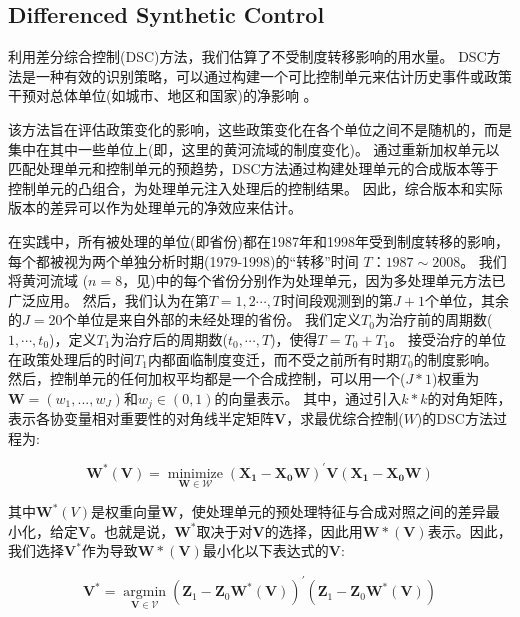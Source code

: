 \subsection{Differenced Synthetic Control}\label{sec:DSC}

利用差分综合控制(DSC)方法，我们估算了不受制度转移影响的用水量。
DSC方法是一种有效的识别策略，可以通过构建一个可比控制单元来估计历史事件或政策干预对总体单位(如城市、地区和国家)的净影响 \cite{abadie2010, abadie2015, hill2021}。

该方法旨在评估政策变化的影响，这些政策变化在各个单位之间不是随机的，而是集中在其中一些单位上(即，这里的黄河流域的制度变化)。
通过重新加权单元以匹配处理单元和控制单元的预趋势，DSC方法通过构建处理单元的合成版本等于控制单元的凸组合，为处理单元注入处理后的控制结果。
因此，综合版本和实际版本的差异可以作为处理单元的净效应来估计。

在实践中，所有被处理的单位(即省份)都在1987年和1998年受到制度转移的影响，每个都被视为两个单独分析时期(1979-1998)的“转移”时间 $T$：$1987 \sim 2008$。
我们将黄河流域 ($n=8$，见\textit{})中的每个省份分别作为处理单元，因为多处理单元方法已广泛应用\cite{abadie2021}。
然后，我们认为在第$T = {1,2 \cdots , T}$时间段观测到的第$J+1$个单位，其余的$J=20$个单位是来自外部的未经处理的省份。
我们定义$T_0$为治疗前的周期数($1,\cdots,t_0$)，定义$T_1$为治疗后的周期数($t_0,\cdots,T$)，使得$T = T_0+ T_1$。
接受治疗的单位在政策处理后的时间$T_1$内都面临制度变迁，而不受之前所有时期$T_0$的制度影响。
然后，控制单元的任何加权平均都是一个合成控制，可以用一个($J * 1$)权重为$\mathbf{W} = (w_{1},...,w_{J})$和$w_j \in (0, 1)$的向量表示。
其中，通过引入$k * k$的对角矩阵，表示各协变量相对重要性的对角线半定矩阵$\mathbf{V}$，求最优综合控制($W$)的DSC方法过程为:

\begin{equation}
    \mathbf{W^{*}(V)}=\underset{\mathbf{W} \in \mathcal{W}}{\operatorname{minimize}}\left(\mathbf{X}_{\mathbf{1}}-\mathbf{X}_{\mathbf{0}} \mathbf{W}\right)^{\prime} \mathbf{V}\left(\mathbf{X}_{\mathbf{1}}-\mathbf{X}_{\mathbf{0}} \mathbf{W}\right)
\end{equation}

其中$\mathbf{W}^{*}(V)$是权重向量$\mathbf{W}$，使处理单元的预处理特征与合成对照之间的差异最小化，给定$\mathbf{V}$。也就是说，$\mathbf{W^{*}}$取决于对$\mathbf{V}$的选择，因此用$\mathbf{W*(V)}$表示。因此，我们选择$\mathbf{V^{*}}$作为导致$\mathbf{W*(V)}$最小化以下表达式的$\mathbf{V}$:

\begin{equation}
    \mathbf{V}^{*}=\underset{\mathbf{V} \in \mathcal{V}}{\operatorname{argmin}}\left(\mathbf{Z}_{1}-\mathbf{Z}_{0} \mathbf{W}^{*}(\mathbf{V})\right)^{\prime}\left(\mathbf{Z}_{1}-\mathbf{Z}_{0} \mathbf{W}^{*}(\mathbf{V})\right)
\end{equation}

